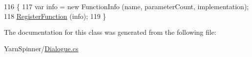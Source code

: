 \begin{DoxyCode}
116                                                                                                \{
117             var info = \textcolor{keyword}{new} FunctionInfo (name, parameterCount, implementation);
118             \hyperlink{a00063_a001ab29d21fe7db10fc9c250914287f9}{RegisterFunction} (info);
119         \}
\end{DoxyCode}


The documentation for this class was generated from the following file\-:\begin{DoxyCompactItemize}
\item 
Yarn\-Spinner/\hyperlink{a00138}{Dialogue.\-cs}\end{DoxyCompactItemize}
